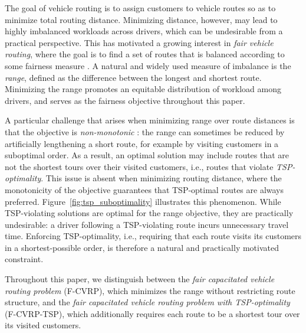 \documentclass[a4paper,fleqn]{cas-dc}%
\begin{document}
The goal of vehicle routing is to assign customers to vehicle routes so as to minimize total routing distance. Minimizing distance, however, may lead to highly imbalanced workloads across drivers, which can be undesirable from a practical perspective. This has motivated a growing interest in \emph{fair vehicle routing}, where the goal is to find a set of routes that is balanced according to some fairness measure \citep{agius2026solution, bruinink2025beyond, ljubic2026fairvehicle, matl2018workload, van2024new, rossum2025efficient}. A natural and widely used measure of imbalance is the \emph{range}, defined as the difference between the longest and shortest route. Minimizing the range promotes an equitable distribution of workload among drivers, and serves as the fairness objective throughout this paper.

A particular challenge that arises when minimizing range over route distances is that the objective is \emph{non-monotonic} \citep{matl2018workload}: the range can sometimes be reduced by artificially lengthening a short route, for example by visiting customers in a suboptimal order. As a result, an optimal solution may include routes that are not the shortest tours over their visited customers, i.e., routes that violate \emph{TSP-optimality}. This issue is absent when minimizing routing distance, where the monotonicity of the objective guarantees that TSP-optimal routes are always preferred. Figure~\ref{fig:tsp_suboptimality} illustrates this phenomenon. While TSP-violating solutions are optimal for the range objective, they are practically undesirable: a driver following a TSP-violating route incurs unnecessary travel time. Enforcing TSP-optimality, i.e., requiring that each route visits its customers in a shortest-possible order, is therefore a natural and practically motivated constraint. 

Throughout this paper, we distinguish between the \emph{fair capacitated vehicle routing problem} (F-CVRP), which minimizes the range without restricting route structure, and the \emph{fair capacitated vehicle routing problem with TSP-optimality} (F-CVRP-TSP), which additionally requires each route to be a shortest tour over its visited customers.
\end{document}
